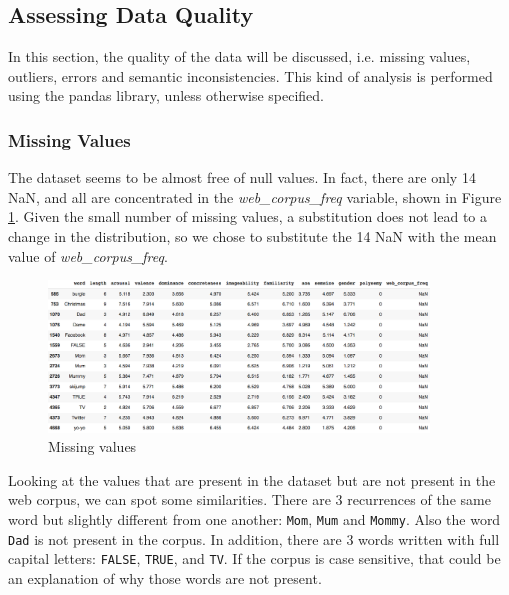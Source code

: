 \documentclass[a4paper,11pt,dvipsnames]{article}
\begin{document}








\subsection{Assessing Data Quality}
In this section, the quality of the data will be discussed, i.e. missing values, outliers, errors and semantic inconsistencies. This kind of analysis is performed using the pandas library, unless otherwise specified.

\subsubsection{Missing Values}

The dataset seems to be almost free of null values. In fact, there are only 14 NaN, and all are concentrated in the \textit{web\_corpus\_freq} variable, shown in Figure \ref{fig:missing}. Given the small number of missing values, a substitution does not lead to a change in the distribution, so we chose to substitute the 14 NaN with the mean value of \textit{web\_corpus\_freq}.

\begin{figure}[h]
    \centering
    \includegraphics[width=0.9\textwidth]{Graphs/NaN.png}
    \caption{Missing values}
    \label{fig:missing}
\end{figure}
Looking at the values that are present in the dataset but are not present in the web corpus, we can spot some similarities. There are 3 recurrences of the same word but slightly different from one another: \texttt{Mom}, \texttt{Mum} and \texttt{Mommy}. Also the word \texttt{Dad} is not present in the corpus. In addition, there are 3 words written with full capital letters: \texttt{FALSE}, \texttt{TRUE}, and \texttt{TV}. If the corpus is case sensitive, that could be an explanation of why those words are not present.
\end{document}
